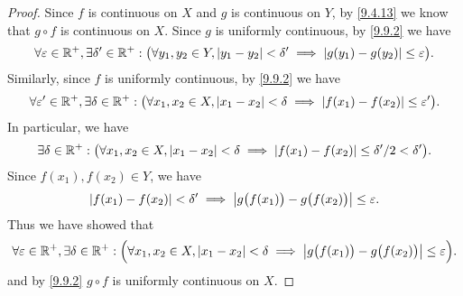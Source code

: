 \begin{proof}
  Since \(f\) is continuous on \(X\) and \(g\) is continuous on \(Y\), by \cref{9.4.13} we know that \(g \circ f\) is continuous on \(X\).
  Since \(g\) is uniformly continuous, by \cref{9.9.2} we have
  \[
    \forall \varepsilon \in \mathbb{R}^+, \exists \delta' \in \mathbb{R}^+ : \big(\forall y_1, y_2 \in Y, \left\lvert y_1 - y_2\right\rvert < \delta' \implies \left\lvert g(y_1) - g(y_2)\right\rvert \leq \varepsilon\big).
  \]
  Similarly, since \(f\) is uniformly continuous, by \cref{9.9.2} we have
  \[
    \forall \varepsilon' \in \mathbb{R}^+, \exists \delta \in \mathbb{R}^+ : \big(\forall x_1, x_2 \in X, \left\lvert x_1 - x_2\right\rvert < \delta \implies \left\lvert f(x_1) - f(x_2)\right\rvert \leq \varepsilon'\big).
  \]
  In particular, we have
  \[
    \exists \delta \in \mathbb{R}^+ : \big(\forall x_1, x_2 \in X, \left\lvert x_1 - x_2\right\rvert < \delta \implies \left\lvert f(x_1) - f(x_2)\right\rvert \leq \delta' / 2 < \delta'\big).
  \]
  Since \(f(x_1), f(x_2) \in Y\), we have
  \[
    \left\lvert f(x_1) - f(x_2)\right\rvert < \delta' \implies \left\lvert g\big(f(x_1)\big) - g\big(f(x_2)\big)\right\rvert \leq \varepsilon.
  \]
  Thus we have showed that
  \[
    \forall \varepsilon \in \mathbb{R}^+, \exists \delta \in \mathbb{R}^+ : \Big(\forall x_1, x_2 \in X, \left\lvert x_1 - x_2\right\rvert < \delta \implies \left\lvert g\big(f(x_1)\big) - g\big(f(x_2)\big)\right\rvert \leq \varepsilon\Big).
  \]
  and by \cref{9.9.2} \(g \circ f\) is uniformly continuous on \(X\).
\end{proof}